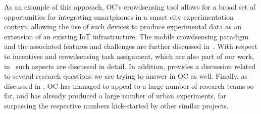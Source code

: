 As an example of this approach, OC's crowdsensing tool allows for a broad set of opportunities for integrating smartphones in a smart city experimentation context, allowing the use of such devices to produce experimental data as an extension of an existing IoT infrastructure. %
The mobile crowdsensing paradigm and the associated features and challenges are further discussed in~\cite{%
crowdsensing-guo2}. With respect to incentives and crowdsensing task assignment, which are also part of our work, in~\cite{aliens, incentives-survey} such aspects are discussed in detail. In addition, \cite{balestrini-orchestration, ledantec} provides a discussion related to several research questions we are trying to answer in OC as well. Finally, as discussed in , OC has managed to appeal to a large number of research teams so far, and has already produced a large number of urban experiments, far surpassing the respective numbers kick-started by other similar projects.
